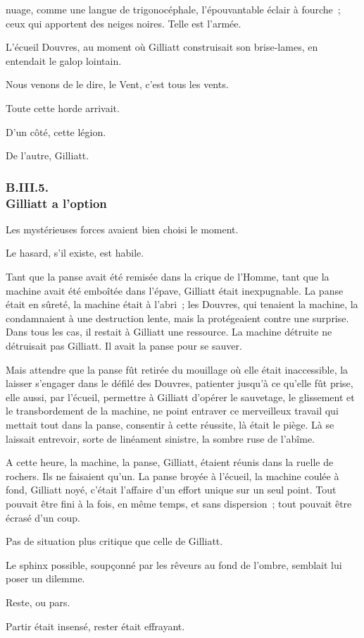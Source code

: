 \documentclass[french,twoside]{book} %
\begin{document}
nuage, comme une langue de trigonocéphale, l’épouvantable éclair à fourche ; ceux qui apportent des neiges noires. Telle est l’armée.\par
L’écueil Douvres, au moment où Gilliatt construisait son brise-lames, en entendait le galop lointain.\par
 Nous venons de le dire, le Vent, c’est tous les vents.\par
Toute cette horde arrivait.\par
D’un côté, cette légion.\par
De l’autre, Gilliatt.
 \subsubsection[{B.III.5. Gilliatt a l’option}]{B.III.5. \\
Gilliatt a l’option}
\noindent Les mystérieuses forces avaient bien choisi le moment.\par
Le hasard, s’il existe, est habile.\par
Tant que la panse avait été remisée dans la crique de l’Homme, tant que la machine avait été emboîtée dans l’épave, Gilliatt était inexpugnable. La panse était en sûreté, la machine était à l’abri ; les Douvres, qui tenaient la machine, la condamnaient à une destruction lente, mais la protégeaient contre une surprise. Dans tous les cas, il restait à Gilliatt une ressource. La machine détruite ne détruisait pas Gilliatt. Il avait la panse pour se sauver.\par
Mais attendre que la panse fût retirée du mouillage où elle était inaccessible, la laisser s’engager dans le défilé des Douvres, patienter jusqu’à ce qu’elle fût prise, elle aussi, par l’écueil, permettre à Gilliatt d’opérer le sauvetage, le glissement et le transbordement de la machine, ne point entraver ce merveilleux  travail qui mettait tout dans la panse, consentir à cette réussite, là était le piège. Là se laissait entrevoir, sorte de linéament sinistre, la sombre ruse de l’abîme.\par
A cette heure, la machine, la panse, Gilliatt, étaient réunis dans la ruelle de rochers. Ils ne faisaient qu’un. La panse broyée à l’écueil, la machine coulée à fond, Gilliatt noyé, c’était l’affaire d’un effort unique sur un seul point. Tout pouvait être fini à la fois, en même temps, et sans dispersion ; tout pouvait être écrasé d’un coup.\par
Pas de situation plus critique que celle de Gilliatt.\par
Le sphinx possible, soupçonné par les rêveurs au fond de l’ombre, semblait lui poser un dilemme.\par
Reste, ou pars.\par
Partir était insensé, rester était effrayant.
\end{document}
